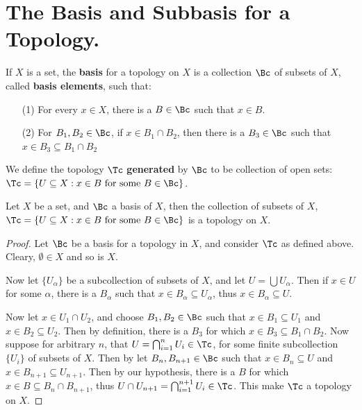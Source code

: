 
\section{The Basis and Subbasis for a Topology.}

\begin{definition}
    If $X$ is a set, the \textbf{basis} for a topology on $X$ is a collection $\Bc$ of
    subsets of  $X$, called \textbf{basis elements}, such that:
        \begin{enumerate}
            \item[(1)] For every $x \in X$, there is a  $B \in \Bc$ such that $x \in B$.

            \item[(2)] For $B_1,B_2 \in \Bc$, if $x \in B_1 \cap B_2$, then there is a $B_3 \in \Bc$
                such that $x \in B_3 \subseteq B_1 \cap B_2$
        \end{enumerate}
We define the topology $\Tc$ \textbf{generated} by $\Bc$ to be collection of open sets:
$\Tc=\{U \subseteq X: x \in B \text{ for some } B \in \Bc\}$.
\end{definition}

\begin{theorem}\label{1.2.1}
    Let $X$ be a set, and  $\Bc$ a basis of  $X$, then the collection of subsets
    of  $X$, $\Tc=\{U \subseteq X: x \in B \text{ for some } B \in \Bc\}$ is a topology on $X$.
\end{theorem}
\begin{proof}
    Let $\Bc$ be a basis for a topology in  $X$, and consider  $\Tc$ as defined
    above. Cleary, $\emptyset \in X$ and so is  $X$.

    Now let  $\{U_{\alpha}\}$ be a subcollection of subsets of  $X$, and let  $U=\bigcup{U_{\alpha}}$.
    Then if  $x \in U$ for some  $\alpha$, there is a  $B_{\alpha}$ such that  $x \in B_{\alpha} \subseteq U_{\alpha}$,
    thus  $x \in B_{\alpha} \subseteq U$.

    Now let  $x \in  U_1 \cap U_2$, and choose $B_1,B_2 \in \Bc$ such that $x \in B_1 \subseteq U_1$
    and $x \in B_2 \subseteq U_2$. Then  by definition, there is a $B_3$ for which $x \in B_3 \subseteq B_1 \cap B_2$.
    Now suppose for arbitrary $n$, that  $U=\bigcap_{i=1}^{n}{U_i} \in \Tc$, for some finite
    subcollection  $\{U_i\}$ of subsets of  $X$. Then by let  $B_n, B_{n+1} \in \Bc$ such that
    $x \in B_n \subseteq U$ and  $x \in B_{n+1} \subseteq U_{n+1}$. Then by our hypothesis, there is a  $B$
for which  $x \in B \subseteq B_n \cap B_{n+1}$, thus  $U \cap U_{n+1}=\bigcap_{i=1}^{n+1}{U_i} \in \Tc$.
This make $\Tc$ a topology on  $X$.
\end{proof}

